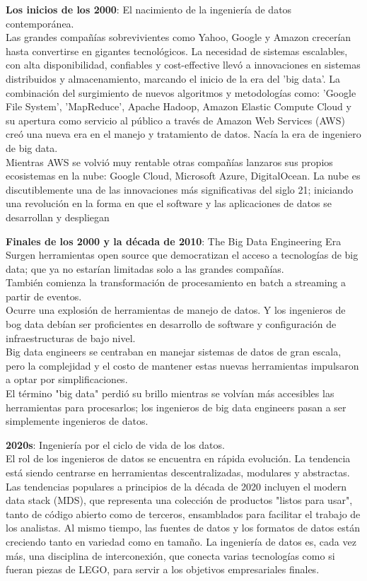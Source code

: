 \documentclass[12pt]{book}
\begin{document}
\textbf{Los inicios de los 2000}: El nacimiento de la ingeniería de datos contemporánea.\\
Las grandes compañías sobrevivientes como Yahoo, Google y Amazon crecerían hasta convertirse en gigantes tecnológicos. 
La necesidad de sistemas escalables, con alta disponibilidad, confiables y cost-effective llevó a innovaciones en sistemas distribuidos y almacenamiento, marcando el inicio de la era del 'big data'. La combinación del surgimiento de nuevos algoritmos y metodologías como: 'Google File System', 'MapReduce', Apache Hadoop, Amazon Elastic Compute Cloud y su apertura como servicio al público a través de Amazon Web Services (AWS) creó una nueva era en el manejo y tratamiento de datos.
Nacía la era de ingeniero de big data.\\
Mientras AWS se volvió muy rentable otras compañías lanzaros sus propios ecosistemas en la nube: Google Cloud, Microsoft Azure, DigitalOcean. La nube es discutiblemente una de las innovaciones más significativas del siglo 21; iniciando una revolución en la forma en que el software y las aplicaciones de datos se desarrollan y despliegan

\textbf{Finales de los 2000 y la década de 2010}: The Big Data Engineering Era\\
Surgen herramientas open source que democratizan el acceso a tecnologías de big data; que ya no estarían limitadas solo a las grandes compañías. \\
También comienza la transformación de procesamiento en batch a streaming a partir de eventos. \\
Ocurre una explosión de herramientas de manejo de datos. Y los ingenieros de bog data debían ser proficientes en desarrollo de software y configuración de infraestructuras de bajo nivel. \\
Big data engineers se centraban en manejar sistemas de datos de gran escala, pero la complejidad y el costo de mantener  estas nuevas herramientas impulsaron a optar por simplificaciones. \\
El término "big data" perdió su brillo mientras se volvían más accesibles las herramientas para procesarlos; los ingenieros de big data engineers pasan a ser simplemente ingenieros de datos.

\textbf{2020s}: Ingeniería por el ciclo de vida de los datos.\\
El rol de los ingenieros de datos se encuentra en rápida evolución. La tendencia está siendo centrarse en herramientas descentralizadas, modulares y abstractas. 
Las tendencias populares a principios de la década de 2020 incluyen el modern data stack (MDS), que representa una colección de productos "listos para usar", tanto de código abierto como de terceros, ensamblados para facilitar el trabajo de los analistas. Al mismo tiempo, las fuentes de datos y los formatos de datos están creciendo tanto en variedad como en tamaño. La ingeniería de datos es, cada vez más, una disciplina de interconexión, que conecta varias tecnologías como si fueran piezas de LEGO, para servir a los objetivos empresariales finales. 
\end{document}
